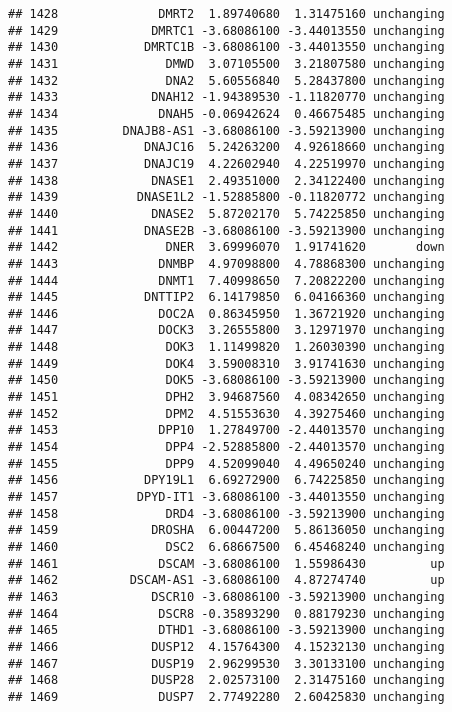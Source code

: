 \documentclass[]{article}
\begin{document}
\begin{verbatim}
## 1428              DMRT2  1.89740680  1.31475160 unchanging
## 1429             DMRTC1 -3.68086100 -3.44013550 unchanging
## 1430            DMRTC1B -3.68086100 -3.44013550 unchanging
## 1431               DMWD  3.07105500  3.21807580 unchanging
## 1432               DNA2  5.60556840  5.28437800 unchanging
## 1433             DNAH12 -1.94389530 -1.11820770 unchanging
## 1434              DNAH5 -0.06942624  0.46675485 unchanging
## 1435         DNAJB8-AS1 -3.68086100 -3.59213900 unchanging
## 1436            DNAJC16  5.24263200  4.92618660 unchanging
## 1437            DNAJC19  4.22602940  4.22519970 unchanging
## 1438             DNASE1  2.49351000  2.34122400 unchanging
## 1439           DNASE1L2 -1.52885800 -0.11820772 unchanging
## 1440             DNASE2  5.87202170  5.74225850 unchanging
## 1441            DNASE2B -3.68086100 -3.59213900 unchanging
## 1442               DNER  3.69996070  1.91741620       down
## 1443              DNMBP  4.97098800  4.78868300 unchanging
## 1444              DNMT1  7.40998650  7.20822200 unchanging
## 1445            DNTTIP2  6.14179850  6.04166360 unchanging
## 1446              DOC2A  0.86345950  1.36721920 unchanging
## 1447              DOCK3  3.26555800  3.12971970 unchanging
## 1448               DOK3  1.11499820  1.26030390 unchanging
## 1449               DOK4  3.59008310  3.91741630 unchanging
## 1450               DOK5 -3.68086100 -3.59213900 unchanging
## 1451               DPH2  3.94687560  4.08342650 unchanging
## 1452               DPM2  4.51553630  4.39275460 unchanging
## 1453              DPP10  1.27849700 -2.44013570 unchanging
## 1454               DPP4 -2.52885800 -2.44013570 unchanging
## 1455               DPP9  4.52099040  4.49650240 unchanging
## 1456            DPY19L1  6.69272900  6.74225850 unchanging
## 1457           DPYD-IT1 -3.68086100 -3.44013550 unchanging
## 1458               DRD4 -3.68086100 -3.59213900 unchanging
## 1459             DROSHA  6.00447200  5.86136050 unchanging
## 1460               DSC2  6.68667500  6.45468240 unchanging
## 1461              DSCAM -3.68086100  1.55986430         up
## 1462          DSCAM-AS1 -3.68086100  4.87274740         up
## 1463             DSCR10 -3.68086100 -3.59213900 unchanging
## 1464              DSCR8 -0.35893290  0.88179230 unchanging
## 1465              DTHD1 -3.68086100 -3.59213900 unchanging
## 1466             DUSP12  4.15764300  4.15232130 unchanging
## 1467             DUSP19  2.96299530  3.30133100 unchanging
## 1468             DUSP28  2.02573100  2.31475160 unchanging
## 1469              DUSP7  2.77492280  2.60425830 unchanging

\end{verbatim}
\end{document}
